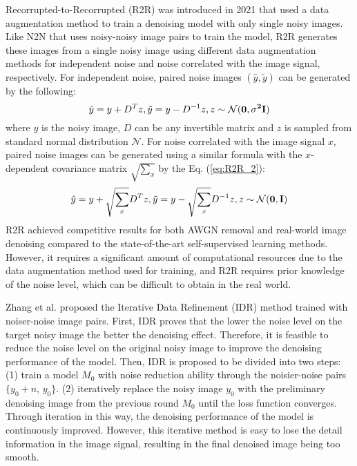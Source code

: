 \documentclass[conference]{IEEEtran}
\begin{document}
Recorrupted-to-Recorrupted (R2R) \cite{pang2021recorrupted} was introduced in 2021 that used a data augmentation method to train a denoising model with only single noisy images. Like N2N \cite{lehtinen2018noise2noise} that uses noisy-noisy image pairs to train the model, R2R generates these images from a single noisy image using different data augmentation methods for independent noise and noise correlated with the image signal, respectively.
For independent noise, paired noise images $(\hat{y}, \tilde{y})$ can be generated by the following:
\begin{equation}
	\setlength{\abovedisplayskip}{0pt}
	\setlength{\belowdisplayskip}{0pt}
	\hat{y}=y+D^Tz, \tilde{y} = y-D^{-1}z, z \sim \mathcal{N}(\bf{0},\bf{\sigma^2I})
	\label{eq:R2R_1}
\end{equation}
where $y$ is the noisy image, $D$ can be any invertible matrix and $z$ is sampled from standard normal distribution $\mathcal{N}$.
For noise correlated with the image signal $x$, paired noise images can be generated using a similar formula with the $x$-dependent covariance matrix $\sqrt{\sum_x}$ by the Eq. (\ref{eq:R2R_2}):
\begin{equation}
	\setlength{\abovedisplayskip}{0pt}
	\setlength{\belowdisplayskip}{0pt}
	\hat{y}=y+\sqrt{\sum_x}D^Tz, \tilde{y} = y-\sqrt{\sum_x}D^{-1}z, z \sim \mathcal{N}(\bf{0,I})
	\label{eq:R2R_2}
\end{equation}
R2R achieved competitive results for both AWGN removal and real-world image denoising compared to the state-of-the-art self-supervised learning methods. However, it requires a significant amount of computational resources due to the data augmentation method used for training, and R2R requires prior knowledge of the noise level, which can be difficult to obtain in the real world.

Zhang et al. \cite{zhang2022idr} proposed the Iterative Data Refinement (IDR) method trained with noiser-noise image pairs. First, IDR proves that the lower the noise level on the target noisy image the better the denoising effect. Therefore, it is feasible to reduce the noise level on the original noisy image to improve the denoising performance of the model. Then, IDR is proposed to be divided into two steps: (1) train a model $M_0$ with noise reduction ability through the noisier-noise pairs $\{y_0+n$, $y_0\}$. (2) iteratively replace the noisy image $y_0$ with the preliminary denoising image from the previous round $M_0$ until the loss function converges.
Through iteration in this way, the denoising performance of the model is continuously improved. However, this iterative method is easy to lose the detail information in the image signal, resulting in the final denoised image being too smooth.
\end{document}

